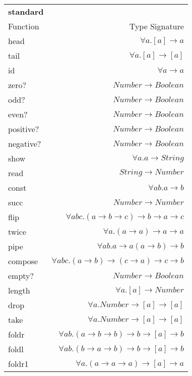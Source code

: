 \begin{table}[H]
    \begin{tabular}{l r}
    \rowcolor{light-gray}
    \textbf{standard} & \\
    Function & Type Signature \\
    \hline
    head & $\forall a. [a] \rightarrow a$ \\
    tail & $\forall a. [a] \rightarrow [a]$ \\
    id & $\forall a \rightarrow a$ \\
    zero? &  $Number \rightarrow Boolean$ \\
    odd? & $Number \rightarrow Boolean$ \\
    even? & $Number \rightarrow Boolean$ \\
    positive? & $Number \rightarrow Boolean$ \\
    negative? & $Number \rightarrow Boolean$ \\
    show & $\forall a. a \rightarrow String$ \\
    read  & $String \rightarrow Number$ \\
    const & $\forall a b. a \rightarrow b$ \\
    succ & $Number \rightarrow Number$ \\
    flip & $\forall a b c. (a \rightarrow b \rightarrow c) \rightarrow b \rightarrow a \rightarrow c$ \\
    twice & $\forall a. (a \rightarrow a) \rightarrow a \rightarrow a$ \\
    pipe & $\forall a b. a \rightarrow a (a \rightarrow b) \rightarrow b$ \\
    compose & $\forall a b c. (a \rightarrow b) \rightarrow (c \rightarrow a) \rightarrow c \rightarrow b$\\
    empty? & $Number \rightarrow Boolean$ \\
    length & $\forall a. [a] \rightarrow Number$ \\
    drop & $\forall a. Number \rightarrow [a] \rightarrow [a]$ \\
    take & $\forall a. Number \rightarrow [a] \rightarrow [a]$ \\
    foldr & $\forall a b. (a \rightarrow b \rightarrow b) \rightarrow b \rightarrow [a] \rightarrow b$\\
    foldl & $\forall a b. (b \rightarrow a \rightarrow b) \rightarrow b \rightarrow [a] \rightarrow b$\\
    foldr1 & $\forall a. (a \rightarrow a \rightarrow a) \rightarrow [a] \rightarrow a$\\

\end{tabular}
\end{table}
